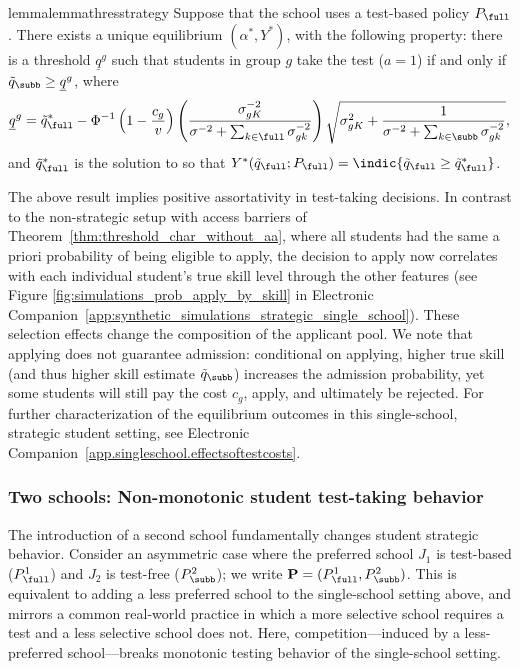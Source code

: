 \begin{restatable}{lemma}{lemmathresstrategy}
\label{lemma.thres.strategy}
Suppose that the school uses a test-based policy $P_{\full}$. There exists a unique equilibrium $(\alpha^*,Y^*)$, with the following property:  there is a threshold $\underline{q}^ g$ such that  students in group $g$  take the test ($a=1$) if and only if $ \tilde q_{\subb}\geq \underline{q}^ g$,
where
\begin{equation}
    \label{eq.decision_threshold_taking_test}
    \underline{q}^g = \tilde q_{\full}^* - \Phi^{-1} \left(1 - \frac{c_g}{v}\right) \left ( \frac{\sigma_{gK}^{-2}}{\sigma^{-2} + \sum_{k \in \full} \sigma_{gk}^{-2}}\right)
\sqrt{\sigma^{2}_{gK} + \frac{1}{\sigma^{-2} + \sum_{k \in \subb} \sigma_{gk}^{-2}} },
\end{equation}
and  $\tilde q^*_{\full}$ is the solution to  so that $Y^*(\tilde q_{\full}; P_{\full})= \indic\{ \tilde q_{\full} \geq \tilde q^*_{\full}\}$.
\end{restatable}

The above result implies positive assortativity in test-taking decisions.
In contrast to the non-strategic setup with access barriers of Theorem~\ref{thm:threshold_char_without_aa}, where all students had  the same a priori probability of being eligible to apply, the decision to apply now correlates with each individual student's true skill level through the other features (see Figure \ref{fig:simulations_prob_apply_by_skill} in Electronic Companion~\ref{app:synthetic_simulations_strategic_single_school}). These selection effects change the composition of the applicant pool.
We note that applying does not guarantee admission: conditional on applying, higher true skill (and thus higher skill estimate $\tilde q_{\subb}$)
increases the admission probability, yet some students will still pay the cost $c_g$, apply, and ultimately be rejected.
For further characterization of the equilibrium outcomes in this single-school, strategic student setting, see Electronic Companion~\ref{app.singleschool.effectsoftestcosts}.



\subsubsection{Two schools: Non-monotonic student test-taking behavior}
\label{sec:twoschoolstrategicbehavior}

The introduction of a second school fundamentally changes student strategic behavior. Consider an asymmetric case where the preferred school $J_1$ is test-based ($P^1_{\full}$) and $J_2$ is test-free ($P^2_{\subb}$); we write $\mathbf P=(P^1_{\full},P^2_{\subb})$.
This is equivalent to adding a less preferred school to the single-school setting above, and mirrors a common real-world practice in which a more selective school requires a test and a less selective school does not.
Here, competition---induced by a less-preferred school---breaks monotonic testing behavior of the single-school setting. %


